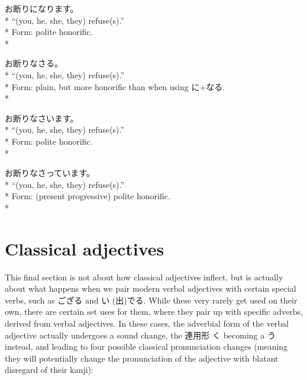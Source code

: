 \documentclass[11pt, b5paper, twoside, openright, onecolumn]{book}
\makeatletter
\newcommand*{\rubystack}[2]{{\relscale{0.5}%
  \begin{tabular}[b]{@{}c@{}}%
    {#1}\\%
   {\textscale{2}{#2}}%
  \end{tabular}}%
}
\DeclareRobustCommand*{\ruby}[2]{%
  \mbox{%
    \setlength{\parskip}{0ex}%
    \BeginAccSupp{method=pdfstringdef,ActualText={#1}}%
      \rubystack{\phantom{#2}}{#1}%
      \llap{%
        \rubystack{#2}{\phantom{#1}}%
      }%
    \EndAccSupp{}%
  }%
}
\renewcommand*{\ruby}[2]{#2 (#1)}%
\newenvironment{exampleblock}{
\setlength{\parindent}{0.6in}
\begin{minipage}[t]{\dimexpr\textwidth-\parindent}}
{\end{minipage}}
\makeatother
\begin{document}
\begin{exampleblock}
お断りになります。 \\* 
“(you‚ he‚ she‚ they) refuse(s).” \\* 
Form: polite honorific. \\* 
\end{exampleblock}
\vspace{0.2cm}

\begin{exampleblock}
お断りなさる。 \\* 
“(you‚ he‚ she‚ they) refuse(s).” \\* 
Form: plain‚ but more honorific than when using に+なる. \\* 
\end{exampleblock}
\vspace{0.2cm}

\begin{exampleblock}
お断りなさいます。 \\* 
“(you‚ he‚ she‚ they) refuse(s).” \\* 
Form: polite honorific. \\* 
\end{exampleblock}
\vspace{0.2cm}

\begin{exampleblock}
お断りなさっています。 \\* 
“(you‚ he‚ she‚ they) refuse(s).” \\* 
Form: (present progressive) polite honorific. \\* 
\end{exampleblock}
\section{Classical adjectives}


This final section is not about how classical adjectives inflect‚ but is actually about what happens when we pair modern verbal adjectives with certain special verbs‚ such as ござる and \ruby{出}{い}でる. While these very rarely get used on their own‚ there are certain set uses for them‚ where they pair up with specific adverbs‚ derived from verbal adjectives. In these cases‚ the adverbial form of the verbal adjective actually undergoes a sound change‚ the 連用形 く becoming a う instead‚ and leading to four possible classical pronunciation changes (meaning they will potentially change the pronunciation of the adjective with blatant disregard of their kanji):
\end{document}
